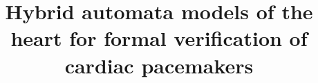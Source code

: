 \documentclass[conference]{IEEEtran}
\begin{document}
	
		\renewcommand\floatpagefraction{.9}
		\renewcommand\dblfloatpagefraction{.95} %
		\renewcommand\topfraction{.95}
		\renewcommand\dbltopfraction{.95} %
		\renewcommand\bottomfraction{.95}
		\renewcommand\textfraction{.1}   
		\setcounter{totalnumber}{50}
		\setcounter{topnumber}{50}
		\setcounter{bottomnumber}{50}
		
		\setlength{\abovecaptionskip}{0pt}
		
		
	
\title{Hybrid automata models of the heart for formal verification of cardiac pacemakers \vspace{-0.5cm} }

\author{

	\vspace{-1cm}
}





\maketitle















 
\end{document}
